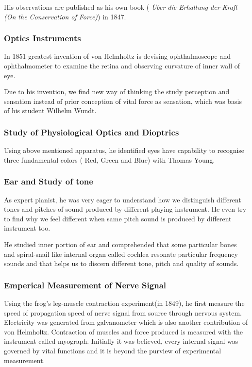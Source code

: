 \documentclass[11pt]{article}
\begin{document}
His observations are published as his own book (\textit{ Über die Erhaltung der Kraft (On the Conservation of Force)}) in 1847. 

\subsubsection{Optics Instruments}
In 1851 greatest invention of von Helmholtz is devising ophthalmoscope and ophthalmometer to examine the retina and observing curvature of inner wall of eye. 

Due to his invention, we find new way of thinking the study perception and sensation instead of prior conception of vital force as sensation, which was basis of his student Wilhelm Wundt.

\subsubsection{Study of Physiological Optics and Dioptrics}
Using above mentioned apparatus, he identified eyes have capability to recognise three fundamental colors ( Red, Green and  Blue) with Thomas Young.


\subsubsection{Ear and Study of tone}
As expert pianist, he was very eager to understand how we distinguish different tones and pitches of sound produced by different playing instrument. He even try to find why we feel different when same pitch sound is produced by different instrument too.

He studied inner portion of ear and comprehended that some particular bones and spiral-snail like internal organ called cochlea resonate particular frequency sounds and that helps us to discern different tone, pitch and quality of sounds.



\subsubsection{Emperical Measurement of Nerve Signal}
Using the frog's leg-muscle contraction experiment(in 1849), he first measure the speed of propagation speed of nerve signal from source through nervous system. Electricity was generated from galvanometer which is also another contribution of von Helmholtz. Contraction of muscles and force produced is measured with the instrument called myograph.
Initially it was believed, every internal signal was governed by vital functions and it is beyond the purview of experimental measurement.
\end{document}
